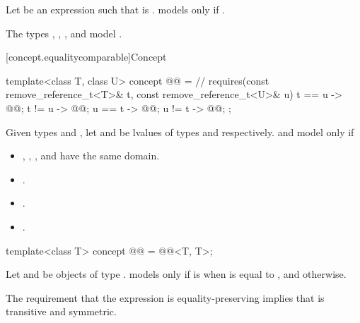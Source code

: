 \pnum
Let  be an expression such that
 is .
 models  only if
.

\pnum
\begin{example}
The types
,
,
, and
model .
\end{example}

[concept.equalitycomparable]{Concept }

\begin{itemdecl}
template<class T, class U>
  concept @@ = // \expos
    requires(const remove_reference_t<T>& t,
             const remove_reference_t<U>& u) {
      { t == u } -> @@;
      { t != u } -> @@;
      { u == t } -> @@;
      { u != t } -> @@;
    };
\end{itemdecl}

\begin{itemdescr}
\pnum
Given types  and ,
let  and  be lvalues of types
 and
 respectively.
 and  model
 only if
\begin{itemize}
\item {}, , , and 
      have the same domain.
\item {}.
\item {}.
\item {}.
\end{itemize}
\end{itemdescr}

\begin{itemdecl}
template<class T>
  concept @@ = @@<T, T>;
\end{itemdecl}

\begin{itemdescr}
\pnum
Let  and  be objects of type .
 models  only if
 is  when  is equal to
, and  otherwise.

\pnum
\begin{note}
The requirement that the expression  is equality-preserving
implies that \tcode{==} is transitive and symmetric.
\end{note}
\end{itemdescr}

